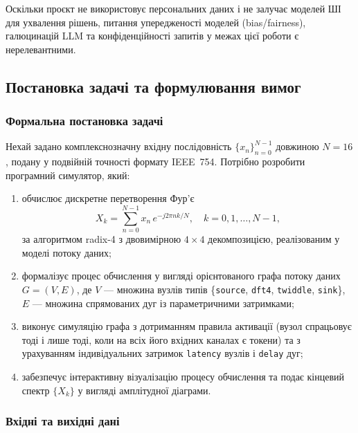 Оскільки проєкт не використовує персональних даних і не залучає
моделей ШІ для ухвалення рішень, питання упередженості моделей
(bias/fairness), галюцинацій LLM та конфіденційності запитів у
межах цієї роботи є нерелевантними.


\subsection{Постановка задачі та формулювання вимог}

\subsubsection*{Формальна постановка задачі}

Нехай задано комплекснозначну вхідну послідовність
$\{x_n\}_{n=0}^{N-1}$ довжиною $N = 16$, подану у подвійній
точності формату IEEE~754. Потрібно розробити програмний
симулятор, який:

\begin{enumerate}
  \item обчислює дискретне перетворення Фур'є
        \begin{equation*}
          X_k = \sum_{n=0}^{N-1} x_n \, e^{-j 2\pi n k / N},
          \quad k = 0, 1, \ldots, N-1,
        \end{equation*}
        за алгоритмом radix-4 з двовимірною $4 \times 4$
        декомпозицією, реалізованим у моделі потоку даних;
  \item формалізує процес обчислення у вигляді орієнтованого
        графа потоку даних $G = (V, E)$, де $V$ --- множина вузлів
        типів \{\texttt{source}, \texttt{dft4}, \texttt{twiddle},
        \texttt{sink}\}, $E$ --- множина спрямованих дуг із
        параметричними затримками;
  \item виконує симуляцію графа з дотриманням правила активації
        (вузол спрацьовує тоді і лише тоді, коли на всіх його
        вхідних каналах є токени) та з урахуванням індивідуальних
        затримок \texttt{latency} вузлів і \texttt{delay} дуг;
  \item забезпечує інтерактивну візуалізацію процесу обчислення
        та подає кінцевий спектр $\{X_k\}$ у вигляді амплітудної
        діаграми.
\end{enumerate}

\subsubsection*{Вхідні та вихідні дані}

